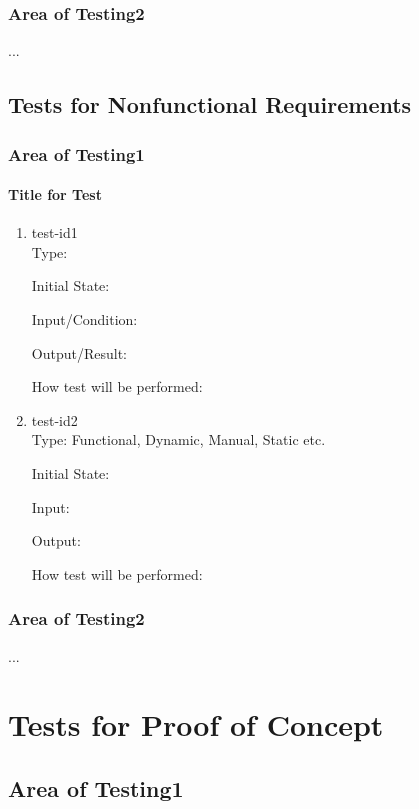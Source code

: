 \documentclass[12pt, titlepage]{article}
\begin{document}
\subsubsection{Area of Testing2}
...
\subsection{Tests for Nonfunctional Requirements}
\subsubsection{Area of Testing1}
		
\paragraph{Title for Test}
\begin{enumerate}
\item{test-id1\\}
Type: 
					
Initial State: 
					
Input/Condition: 
					
Output/Result: 
					
How test will be performed: 
					
\item{test-id2\\}
Type: Functional, Dynamic, Manual, Static etc.
					
Initial State: 
					
Input: 
					
Output: 
					
How test will be performed: 
\end{enumerate}
\subsubsection{Area of Testing2}
...
\section{Tests for Proof of Concept}
\subsection{Area of Testing1}
		
\end{document}
